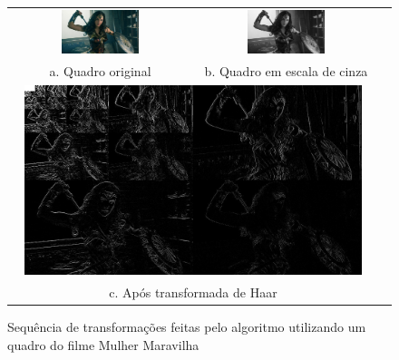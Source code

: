 \begin{figure}[h]
  \centering
  \begin{tabular}{ccc}
  	\centering
    \includegraphics[width=0.45\textwidth]{dados/figuras/ww.jpg} & \includegraphics[width=0.45\textwidth]{dados/figuras/ww_bw.jpg} \\ 
     a. Quadro original & b. Quadro em escala de cinza \\
    \multicolumn{2}{c}{\includegraphics[width=0.94\textwidth]{dados/figuras/ww_haar_.jpg}} \\
    \multicolumn{2}{c}{c. Após transformada de Haar}
  \end{tabular}
  \caption{Sequência de transformações feitas pelo algoritmo utilizando um quadro do filme Mulher Maravilha}
  \label{figure:haar}
\end{figure}

